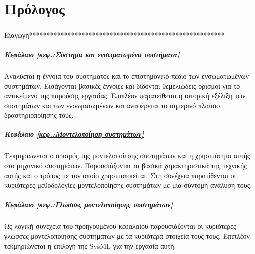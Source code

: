 \documentclass[a4paper,12pt,twoside]{report}
\begin{document}
\pagestyle{fancy}
\fancyhf{}
\renewcommand{\chaptermark}[1]{\markboth{ \emph{#1}}{}}

\fancyhead[RE]{\leftmark}
\fancyfoot[LE,RO]{\thepage}

	\newpage
	\chapter*{Πρόλογος}
	
		\paragraph{}{Ειαγωγή********************************************************
		}
		
		\paragraph{Κεφάλαιο \ref{κεφ.:Σύστημα και ενσωματωμένα συστήματα}} {Αναλύεται η έννοια του συστήματος και το επιστημονικό πεδίο των ενσωματωμένων συστημάτων. Εισάγονται βασικές έννοιες και δίδονται θεμελιώδεις ορισμοί για το αντικείμενο της παρούσης εργασίας. Επιπλέον παρατείθεται η ιστορική εξέλιξη των συστημάτων και των ενσωματωμένων και αναφέρεται το σημερινό πλαίσιο δραστηριοποίησης τους.
		}
		\paragraph{Κεφάλαιο \ref{κεφ.:Μοντελοποίηση συστημάτων}} {Τεκμηριώνεται ο ορισμός της μοντελοποίησης συστημάτων και η χρησιμότητα αυτής στο μηχανικό συστημάτων. Παρουσιάζονται τα βασικά χαρακτηριστικά της τεχνικής αυτής και ο τρόπος με τον οποίο χρησιμοποιείται. Στη συνέχεια παρατίθενται οι κυριότερες μεθοδολογίες μοντελοποίησης συστημάτων με μία σύντομη ανάλυση τους.
		}
		\paragraph{Κεφάλαιο \ref{κεφ.:Γλώσσες μοντελοποίησης συστημάτων}} {Ως λογική συνέχεια του προηγουμένου κεφαλαίου παρουσιάζονται οι κυριότερες γλώσσες  μοντελοποίησης συστημάτων με τα κυριότερα στοιχεία τους τους. Επιπλέον τεκμηριώνεται η επιλογή της SysML για την εργασία αυτή.
		}
\end{document}

